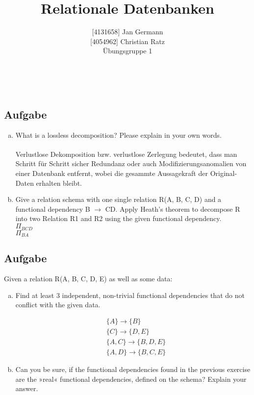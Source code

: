 \documentclass[11pt,a4paper,DIV=9]{scrartcl}
\author{{[}4131658{]} Jan Germann \\{[}4054962{]} Christian Ratz\\Übungsgruppe 1}
\title{Relationale Datenbanken}
\newcounter{temp}
\newcommand{\aufgabe}[1]{
  \setcounter{temp}{\value{subsection}}
  \setcounter{subsection}{#1}
  \addtocounter{subsection}{-1}
  \subsection{Aufgabe}
  \setcounter{subsection}{\value{temp}}
}
\renewcommand{\author}[1]{\renewcommand{\author}{#1}}
\renewcommand{\title}[1]{\renewcommand{\title}{#1}}
\newcommand{\makehomeworktitle}{
  \begin{minipage}[t]{6.5cm}
    \sf{\author}
  \end{minipage}
  \begin{minipage}[t]{6.5cm}
    \begin{flushright}
      \sf{\title\\\today}
    \end{flushright}
  \end{minipage}
  \\[0.2cm]
  \begin{center}
    \sf{
      \color{blue}{
        \LARGE{Aufgabenblatt \blattnr}
      }
    }
  \end{center}
  \vspace{0.1cm}
}
\begin{document}
\makehomeworktitle
\aufgabe{1}
  \begin{enumerate}[a.]
    \item What is a lossless decomposition? Please explain in your own words. \\\\
    Verlustlose Dekomposition bzw. verlustlose Zerlegung bedeutet, dass man Schritt f\"ur Schritt sicher Redundanz oder auch Modifizierungsanomalien von einer Datenbank entfernt, wobei die gesammte Aussagekraft der Original-Daten erhalten bleibt.
    \item Give a relation schema with one single relation R(A, B, C, D) and a functional dependency B $  \rightarrow $  CD. Apply Heath's theorem to decompose R into two Relation R1 and R2 using the given functional dependency. \\
    $ \Pi_{BCD} $ \\
    $ \Pi_{BA} $ \\
  \end{enumerate}

\aufgabe{2}
  Given a relation R(A, B, C, D, E) as well as some data:
  \begin{enumerate}[a.]
    \item Find at least 3 independent, non-trivial functional dependencies that do not conflict with the given data.

    \begin{align}
      &\{A\}       \rightarrow \{B\}\\
      &\{C\}       \rightarrow \{D,E\}\\
      &\{A, C\}    \rightarrow \{B,D,E\}\\ 
      &\{A, D\}    \rightarrow \{B,C,E\}
    \end{align}

   \item Can you be sure, if the functional dependencies found in the previous exercise are the »real« functional dependencies, defined on the schema? Explain your answer.
  \end{enumerate}
\end{document}
